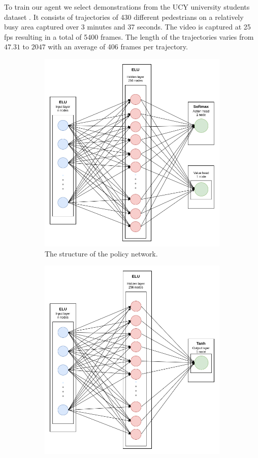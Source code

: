 To train our agent we select demonstrations from the UCY university students dataset \cite{ucy-dataset-university-students}. It consists of trajectories of 430 different pedestrians on a relatively busy area captured over 3 minutes and 37 seconds. The video is captured at 25 fps resulting in a total of 5400 frames. The length of the trajectories varies from $47.31$  to $2047$ with an average of 406 frames per trajectory. 
\begin{figure}
    	\begin{subfigure}[b]{.5\textwidth}
    	\centering
    	\includegraphics[width=.9\linewidth]{figures/policy_network.png}
    	\caption{The structure of the policy network.}
    	\label{fig:policy-network}
    \end{subfigure}%
    \begin{subfigure}[b]{.5\textwidth}
    	\centering
    	\includegraphics[width=.9\linewidth]{figures/reward_network.png}

\end{subfigure}
\end{figure}
